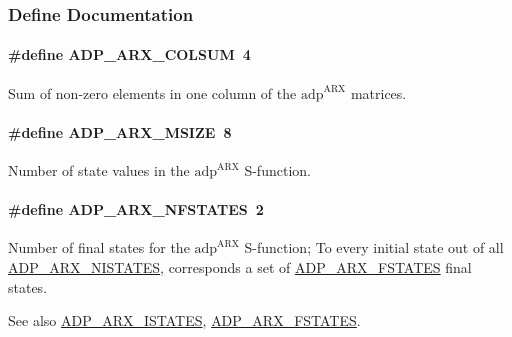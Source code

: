 \subsubsection{\-Define \-Documentation}
\hypertarget{adp-arx_8hh_a116dbb7b7f9b74d35cb3552cd8b009b9}{
\paragraph[{\-A\-D\-P\-\_\-\-A\-R\-X\-\_\-\-C\-O\-L\-S\-U\-M}]{\setlength{\rightskip}{0pt plus 5cm}\#define {\bf \-A\-D\-P\-\_\-\-A\-R\-X\-\_\-\-C\-O\-L\-S\-U\-M}~4}}\label{adp-arx_8hh_a116dbb7b7f9b74d35cb3552cd8b009b9}
\-Sum of non-\/zero elements in one column of the $\mathrm{adp}^{\mathrm{ARX}}$ matrices. \hypertarget{adp-arx_8hh_af665f75e00f5755b68319f5907f75823}{
\paragraph[{\-A\-D\-P\-\_\-\-A\-R\-X\-\_\-\-M\-S\-I\-Z\-E}]{\setlength{\rightskip}{0pt plus 5cm}\#define {\bf \-A\-D\-P\-\_\-\-A\-R\-X\-\_\-\-M\-S\-I\-Z\-E}~8}}\label{adp-arx_8hh_af665f75e00f5755b68319f5907f75823}
\-Number of state values in the $\mathrm{adp}^{\mathrm{ARX}}$ \-S-\/function. \hypertarget{adp-arx_8hh_a233a0b6f32ce3bbaac71e99d06e26e1d}{
\paragraph[{\-A\-D\-P\-\_\-\-A\-R\-X\-\_\-\-N\-F\-S\-T\-A\-T\-E\-S}]{\setlength{\rightskip}{0pt plus 5cm}\#define {\bf \-A\-D\-P\-\_\-\-A\-R\-X\-\_\-\-N\-F\-S\-T\-A\-T\-E\-S}~2}}\label{adp-arx_8hh_a233a0b6f32ce3bbaac71e99d06e26e1d}
\-Number of final states for the $\mathrm{adp}^{\mathrm{ARX}}$ \-S-\/function; \-To every initial state out of all \hyperlink{adp-arx_8hh_af9236f8d08a54b97ed2199271de979f6}{\-A\-D\-P\-\_\-\-A\-R\-X\-\_\-\-N\-I\-S\-T\-A\-T\-E\-S}, corresponds a set of \hyperlink{adp-arx_8hh_af70040b1b46c82f1fbe37b5bab89d7db}{\-A\-D\-P\-\_\-\-A\-R\-X\-\_\-\-F\-S\-T\-A\-T\-E\-S} final states. \begin{DoxySeeAlso}{\-See also}
\hyperlink{adp-arx_8hh_a94f941841e2bc961bc9abd1c7e0b8513}{\-A\-D\-P\-\_\-\-A\-R\-X\-\_\-\-I\-S\-T\-A\-T\-E\-S}, \hyperlink{adp-arx_8hh_af70040b1b46c82f1fbe37b5bab89d7db}{\-A\-D\-P\-\_\-\-A\-R\-X\-\_\-\-F\-S\-T\-A\-T\-E\-S}. 
\end{DoxySeeAlso}
